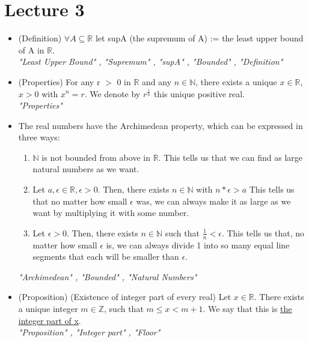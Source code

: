 \documentclass{article}
\begin{document}
\section{Lecture 3}
\begin{itemize}
    \item (Definition) $\forall A \subseteq \mathbb{R}$ let supA (the supremum of A) := the least upper bound of A in $\mathbb{R}$. \\ 
    \vspace{.25cm} \textit{"Least Upper Bound" , "Supremum" , "supA" , "Bounded" , "Definition"}
    \item (Properties) For any r $>$ 0 in $\mathbb{R}$ and any $n \in \mathbb{N}$, there exists a unique $x \in \mathbb{R}$, $x >0$ with $x^n = r$. We denote by $r^{\frac{1}{n}}$ this unique positive real. \\
    \vspace{.25cm} \textit{"Properties"}
    
    \item The real numbers have the Archimedean property, which can be expressed in three ways:
    \begin{enumerate}
        \item $\mathbb{N}$ is not bounded from above in $\mathbb{R}$. This tells us that we can find as large natural numbers as we want.
        \item Let $a, \epsilon \in \mathbb{R},  \epsilon > 0$. Then, there exists $n \in \mathbb{N}$ with $ n* \epsilon >a$ This tells us that no matter how small $\epsilon$ was, we can always make it as large as we want by multiplying it with some number.
        \item Let $\epsilon >0$. Then, there exists $n \in \mathbb{N}$ such that $\frac{1}{n} < \epsilon$. This tells us that, no matter how small $\epsilon$ is, we can always divide 1 into so many equal line segments that each will be smaller than $\epsilon$.
        
    \end{enumerate}
    \textit{"Archimedean" , "Bounded" , "Natural Numbers"}
    
    \item (Proposition) (Existence of integer part of every real) Let $x \in \mathbb{R}$. There exists a unique integer $m \in \mathbb{Z}$, such that $m \leq x < m+1$. We say that this is \underline{the integer part of x}. \\
    \vspace{.25cm} \textit{"Proposition" , "Integer part" , "Floor"}
    

\end{itemize}
\end{document}
